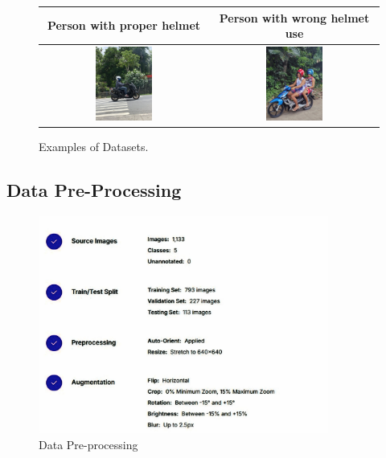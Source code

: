 \begin{refsection}
\begin{figure}[H]
\begin{tabular}{|c|c|}
\hline
Person with proper helmet & Person with wrong helmet use \\
\hline
\includegraphics[width=0.35\textwidth]{figures/Fig 10.png} & 
\includegraphics[width=0.35\textwidth]{figures/Fig 11.png} \\
\hline
\end{tabular}

\caption{Examples of Datasets.}
\label{fig:helmet_classification}
\end{figure}

\subsection{Data Pre-Processing}

\begin{figure}[ht]
    \centering
	\includegraphics[width=0.85\textwidth]{figures/Fig 12.jpg}
	\caption[Data Pre-processing]{Data Pre-processing}
	\label{fig:data_preprocessing}
\end{figure}


\end{refsection}
